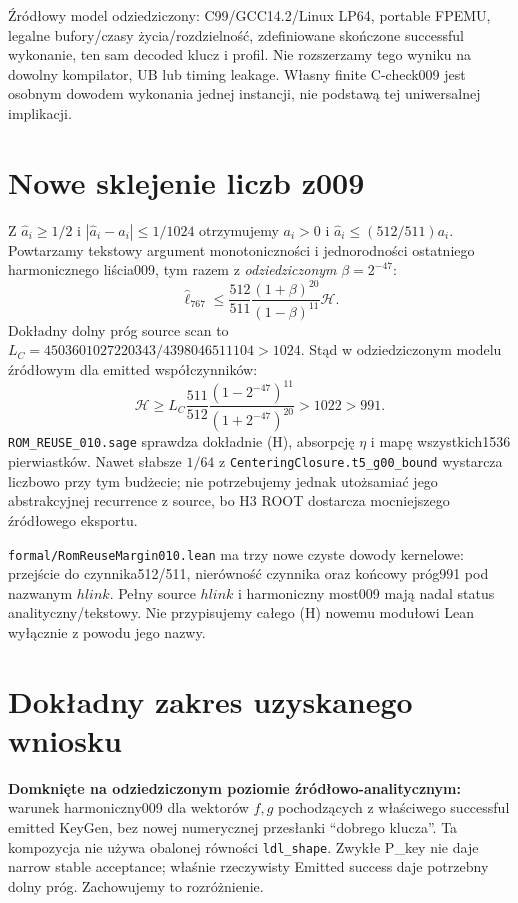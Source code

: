 \documentclass[11pt,a4paper]{article}
\newcommand{\code}[1]{\nolinkurl{#1}}
\newcommand{\HH}{\mathcal H}
\begin{document}
Źródłowy model odziedziczony: C99/GCC14.2/Linux LP64, portable FPEMU,
legalne bufory/czasy życia/rozdzielność, zdefiniowane skończone successful
wykonanie, ten sam decoded klucz i profil. Nie rozszerzamy tego wyniku
na dowolny kompilator, UB lub timing leakage. Własny finite C-check009
jest osobnym dowodem wykonania jednej instancji, nie podstawą tej
uniwersalnej implikacji.

\section{Nowe sklejenie liczb z009}
Z $\widehat a_i\ge1/2$ i $|\widehat a_i-a_i|\le1/1024$ otrzymujemy
$a_i>0$ i $\widehat a_i\le(512/511)a_i$.
Powtarzamy tekstowy argument monotoniczności i jednorodności ostatniego
harmonicznego liścia009, tym razem z \emph{odziedziczonym} $\beta=2^{-47}$:
\[
 \widehat\ell_{767}\le
 \frac{512}{511}\frac{(1+\beta)^{20}}{(1-\beta)^{11}}\HH.
\]
Dokładny dolny próg source scan to
$L_C=4503601027220343/4398046511104>1024$.
Stąd w odziedziczonym modelu źródłowym dla emitted współczynników:
\[
 \HH\ge L_C\frac{511}{512}\frac{(1-2^{-47})^{11}}{(1+2^{-47})^{20}}
 >1022>991.                                             \tag{H}
\]
\code{ROM_REUSE_010.sage} sprawdza dokładnie (H), absorpcję $\eta$ i
mapę wszystkich1536 pierwiastków. Nawet słabsze $1/64$ z
\code{CenteringClosure.t5_g00_bound} wystarcza liczbowo przy tym budżecie;
nie potrzebujemy jednak utożsamiać jego abstrakcyjnej recurrence z source,
bo H3 ROOT dostarcza mocniejszego źródłowego eksportu.

\code{formal/RomReuseMargin010.lean} ma trzy nowe czyste dowody kernelowe:
przejście do czynnika512/511, nierówność czynnika oraz końcowy próg991
pod nazwanym $hlink$. Pełny source $hlink$ i harmoniczny most009 mają
nadal status analityczny/tekstowy. Nie przypisujemy całego (H) nowemu
modułowi Lean wyłącznie z powodu jego nazwy.

\section{Dokładny zakres uzyskanego wniosku}
\textbf{Domknięte na odziedziczonym poziomie źródłowo-analitycznym:}
warunek harmoniczny009 dla wektorów $f,g$ pochodzących z właściwego
successful emitted KeyGen, bez nowej numerycznej przesłanki ``dobrego klucza''.
Ta kompozycja nie używa obalonej równości \code{ldl_shape}.
Zwykłe P\_key nie daje narrow stable acceptance; właśnie rzeczywisty
Emitted success daje potrzebny dolny próg. Zachowujemy to rozróżnienie.
\end{document}
